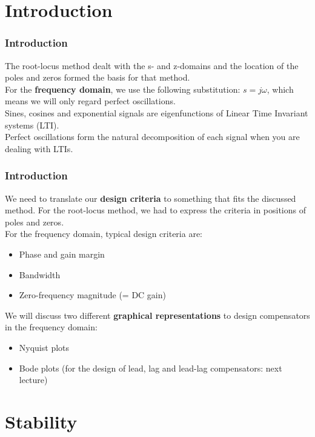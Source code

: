 \section{Introduction}

\begin{frame}
	\frametitle{Introduction}
	\vspace{-10ex}
	The root-locus method dealt with the s- and z-domains and the location of the poles and zeros formed the basis for that method.\\
	\medskip
	For the \textbf{frequency domain}, we use the following substitution: $s=j\omega$, which means we will only regard perfect oscillations.\\
	\medskip
	Sines, cosines and exponential signals are eigenfunctions of Linear Time Invariant systems (LTI).\\
	Perfect oscillations form the natural decomposition of each signal when you are dealing with LTIs.
\end{frame}

\begin{frame}
	\frametitle{Introduction}
	We need to translate our \textbf{design criteria} to something that fits the discussed method. For the root-locus method, we had to express the criteria in positions of poles and zeros.\\
	For the frequency domain, typical design criteria are:
	\begin{itemize}
		\item Phase and gain margin
		\item Bandwidth
		\item Zero-frequency magnitude (= DC gain)
	\end{itemize}
	\bigskip
	We will discuss two different \textbf{graphical representations} to design compensators in the frequency domain:
	\begin{itemize}
		\item Nyquist plots
		\item Bode plots (for the design of lead, lag and lead-lag compensators: next lecture)
	\end{itemize}
\end{frame}

\section{Stability}

